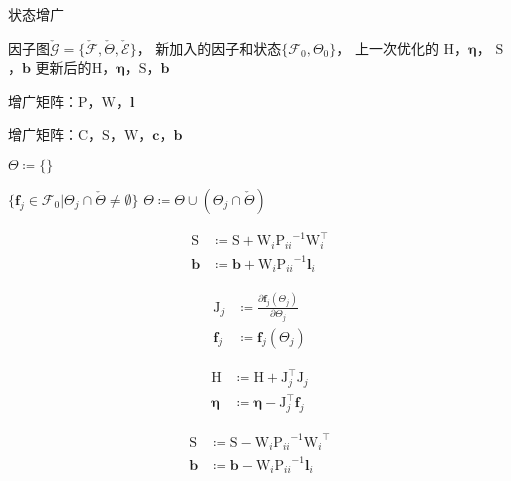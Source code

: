 \begin{algorithm}
\caption{状态增广}
\begin{algorithmic}
    \Require 因子图$\check{\mathcal{G}}=\{\check{\mathcal{F}},\check{\Theta},\check{\mathcal{E}}\}$，
             新加入的因子和状态$\{\mathcal{F}_0,\Theta_0\}$，
             上一次优化的
             $\mathrm{H}$，$\bm{\eta}$，
             $\mathrm{S}$，$\bm{b}$
    \Ensure 更新后的$\mathrm{H}$，$\bm{\eta}$，$\mathrm{S}$，$\bm{b}$

        \State 增广矩阵：$\mathrm{P}$，$\mathrm{W}$，$\bm{l}$
    \EndFor

        \State 增广矩阵：$\mathrm{C}$，$\mathrm{S}$，$\mathrm{W}$，$\bm{c}$，$\bm{b}$
    \EndFor

    \State $\Theta\coloneqq\{\}$

    \ForAll
    {$\{
            \bm{f}_j\in\mathcal{F}_0 |
            \Theta_j \cap \check{\Theta} \neq \emptyset
    \}$}
        \State $\Theta \coloneqq \Theta \cup (\Theta_j \cap \check{\Theta})$
    \EndFor

        \[\begin{aligned}
                \mathrm{S} &\coloneqq \mathrm{S} + \mathrm{W}_i{\mathrm{P}_{ii}}^{-1}\mathrm{W}_i^\top \\
                \bm{b}     &\coloneqq \bm{b}     + \mathrm{W}_i{\mathrm{P}_{ii}}^{-1}\bm{l}_i
        \end{aligned}\]
    \EndFor

        \[\begin{aligned}
                \mathrm{J}_j &\coloneqq \frac{\partial{\bm{f}_j}(\Theta_j)}
                                             {\partial{\Theta_j}} \\
                \bm{f}_j     &\coloneqq \bm{f}_j(\Theta_j)
        \end{aligned}\]

        \[\begin{aligned}
                \mathrm{H} &\coloneqq \mathrm{H} + \mathrm{J}_j^\top\mathrm{J}_j \\
                \bm{\eta}  &\coloneqq \bm{\eta}  - \mathrm{J}_j^\top\bm{f}_j
        \end{aligned}\]
    \EndFor

        \[\begin{aligned}
                \mathrm{S} &\coloneqq \mathrm{S} - \mathrm{W}_i{\mathrm{P}_{ii}}^{-1}{\mathrm{W}_i}^\top \\
                \bm{b}     &\coloneqq \bm{b}     - \mathrm{W}_i{\mathrm{P}_{ii}}^{-1}\bm{l}_i
        \end{aligned}\]
    \EndFor

\end{algorithmic}
\label{alg:factor_graph_aug}
\end{algorithm}
